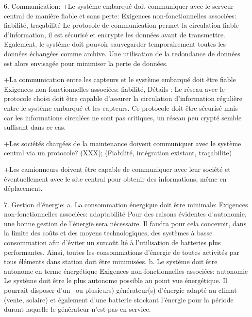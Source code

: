 6. Communication:
+Le système embarqué doit communiquer avec le serveur central de manière fiable et sans perte:
Exigences non-fonctionnelles associées: fiabilité, traçabilité 
Le protocole de communication permet la circulation fiable d’information, il est sécurisé et encrypte les données avant de transmettre. Egalement, le système doit pouvoir sauvegarder temporairement toutes les données échangées comme archive. Une utilisation de la redondance de données est alors envisagée pour minimiser la perte de données.

+La communication entre les capteurs et le système embarqué doit être fiable 
Exigences non-fonctionnelles associées: fiabilité, 
Détails : Le réseau avec le protocole choisi doit être capable d’assurer la circulation d’information régulière entre le système embarqué et les capteurs. Ce protocole doit être sécurisé mais car les informations circulées ne sont pas critiques, un réseau peu crypté semble suffisant dans ce cas.

+Les sociétés chargées de la maintenance doivent communiquer avec le système central via un protocole? (XXX); (Fiabilité, intégration existant, traçabilite)

+Les camionneurs doivent être capable de communiquer avec leur société et éventuellement avec le site central pour obtenir des informations, même en déplacement.


7. Gestion d'énergie:
a. La consommation énergique doit être minimale:
 Exigences non-fonctionnelles associées: adaptabilité 
Pour des raisons évidentes d'autonomie,  une bonne gestion de l'énergie sera nécessaire. Il faudra pour cela concevoir, dans la limite des coûts et des moyens technologiques, des systèmes à basse consommation afin d'éviter un surcoût lié à l'utilisation de batteries plus performantes. Ainsi, toutes les consommations d’énergie de toutes activités par tous éléments dans station doit être minimisées.  
b. Le système doit être autonome en terme énergétique 
Exigences non-fonctionnelles associées: autonomie
Le système doit être le plus autonome possible au point vue énergétique. Il pourrait disposer d’un –ou plusieurs) générateur(s) d’énergie adapté au climat (vente, solaire) et également d’une batterie stockant l'énergie pour la période durant laquelle le générateur n'est pas en service. 

